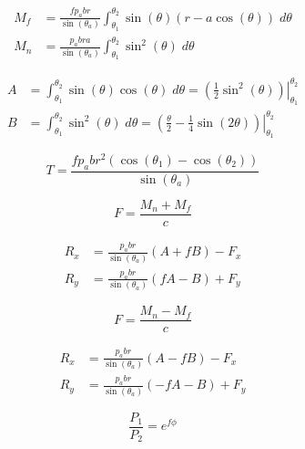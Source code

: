 \documentclass[12pt, letterpaper]{extarticle}
\begin{document}
\newpage
{}

\begin{align*}
    M_{f} &= \frac{fp_{a}br}{\sin(\theta_{a})} \int_{\theta_{1}}^{\theta_{2}} \sin(\theta) (r - a\cos(\theta)) \; d\theta \\
    M_{n} &= \frac{p_{a}bra}{\sin(\theta_{a})} \int_{\theta_{1}}^{\theta_{2}} \sin^{2}(\theta) \; d\theta
\end{align*}

\begin{align*}
    A &= \int_{\theta_{1}}^{\theta_{2}} \sin(\theta)\cos(\theta) \; d\theta = \left.\left(\frac{1}{2}\sin^{2}(\theta)\right) \right|_{\theta_{1}}^{\theta_{2}} \\
    B &= \int_{\theta_{1}}^{\theta_{2}} \sin^{2}(\theta) \; d\theta = \left.\left(\frac{\theta}{2} - \frac{1}{4}\sin(2\theta)\right) \right|_{\theta_{1}}^{\theta_{2}}
\end{align*}

\begin{equation*}
    T = \frac{fp_{a}br^2(\cos(\theta_{1}) - \cos(\theta_{2}))}{\sin(\theta_{a})}
\end{equation*}


\begin{equation*}
    F = \frac{M_{n} + M_{f}}{c}
\end{equation*}

\begin{align*}
    R_{x} &= \frac{p_{a}br}{\sin(\theta_{a})}(A + fB) - F_{x} \\
    R_{y} &= \frac{p_{a}br}{\sin(\theta_{a})}(fA - B) + F_{y}
\end{align*}


\begin{equation*}
    F = \frac{M_{n} - M_{f}}{c}
\end{equation*}

\begin{align*}
    R_{x} &= \frac{p_{a}br}{\sin(\theta_{a})}(A - fB) - F_{x} \\
    R_{y} &= \frac{p_{a}br}{\sin(\theta_{a})}(-fA - B) + F_{y}
\end{align*}

\newpage
{}

\begin{equation*}
    \frac{P_{1}}{P_{2}} = e^{f\phi}
\end{equation*}
\end{document}

